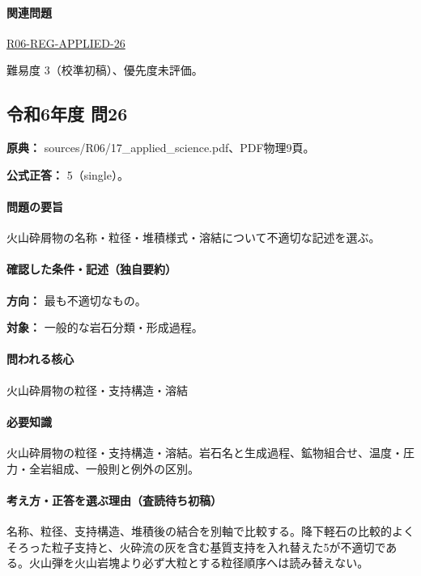 \paragraph{関連問題} \hyperref[q:r06-reg-applied-26]{R06-REG-APPLIED-26}

\par 難易度 3（校準初稿）、優先度未評価。

\subsection{令和6年度 問26}
\label{q:r06-reg-applied-26}

\noindent\textbf{原典：} sources/R06/17\_applied\_science.pdf、PDF物理9頁。

\textbf{公式正答：} 5（single）。

\paragraph{問題の要旨} 火山砕屑物の名称・粒径・堆積様式・溶結について不適切な記述を選ぶ。

\paragraph{確認した条件・記述（独自要約）}\mbox{}\par

\noindent\textbf{方向：} 最も不適切なもの。\par

\noindent\textbf{対象：} 一般的な岩石分類・形成過程。\par

\paragraph{問われる核心} 火山砕屑物の粒径・支持構造・溶結

\paragraph{必要知識} 火山砕屑物の粒径・支持構造・溶結。岩石名と生成過程、鉱物組合せ、温度・圧力・全岩組成、一般則と例外の区別。

\paragraph{考え方・正答を選ぶ理由（査読待ち初稿）} 名称、粒径、支持構造、堆積後の結合を別軸で比較する。降下軽石の比較的よくそろった粒子支持と、火砕流の灰を含む基質支持を入れ替えた5が不適切である。火山弾を火山岩塊より必ず大粒とする粒径順序へは読み替えない。

